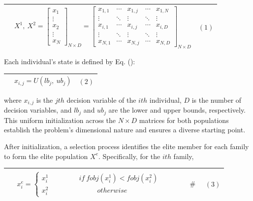 \documentclass{article} %
\begin{document}
\begin{tabular}{|p{0.4in}|p{3.1in}|p{0.4in}|} \hline 
 & $X^1,\ X^2={\left[ \begin{array}{c}
x_1 \\ 
\vdots  \\ 
x_2 \\ 
\vdots  \\ 
x_N \end{array}
\right]}_{N\times D}={\left[ \begin{array}{ccccc}
x_{1,1} & \cdots  & x_{1,j} & \cdots  & x_{1,N} \\ 
\vdots  & \ddots  & \vdots  & \ddots  & \vdots  \\ 
x_{i,1} & \cdots  & x_{i,j} & \cdots  & x_{i,D} \\ 
\vdots  & \ddots  & \vdots  & \ddots  & \vdots  \\ 
x_{N,1} & \cdots  & x_{N,j} & \cdots  & x_{N,D} \end{array}
\right]}_{N\times D}$ & $\left(\mathrm{1}\right)$ \\ \hline 
\end{tabular}



Each individual's state is defined by Eq. \left(\right):

\begin{tabular}{|p{0.4in}|p{3.1in}|p{0.4in}|} \hline 
 & $x_{i,j}=U\left(lb_j,\ ub_j\right)$ & $\left(\mathrm{2}\right)$ \\ \hline 
\end{tabular}

where $x_{i,j}$ is the $jth$ decision variable of the $ith$ individual, $D$ is the number of decision variables, and $lb_j$ and $ub_j$ are the lower and upper bounds, respectively. This uniform initialization across the $N\times D$ matrices for both populations establish the problem's dimensional nature and ensures a diverse starting point.

After initialization, a selection process identifies the elite member for each family to form the elite population $X^e$. Specifically, for the $ith$ family,

\begin{tabular}{|p{0.4in}|p{3.1in}|p{0.4in}|} \hline 
 & $ \begin{array}{c}
x^e_i=\left\{ \begin{array}{c}
x^1_i\ \ \ \ \ \ \ \ \ \ \ \ \ \ \ \ \ \ \ \ if\ fobj\left(x^1_i\right)<fobj\left(x^2_i\right)\ \ \ \ \ \ \ \ \ \ \ \ \ \ \ \ \ \ \  \\ 
x^2_i\ \ \ \ \ \ \ \ \ \ \ \ \ \ \ \ \ \ \ \ \ \ \ \ \ \ \ \ \ \ \ \ otherwise\ \ \ \ \ \ \ \ \ \ \ \ \ \ \ \ \ \ \ \ \ \ \ \ \ \ \ \ \ \ \ \ \ \  \end{array}
\right.\# \end{array}
$ & $\left(\mathrm{3}\right)$ \\ \hline 
\end{tabular}
\end{document}
